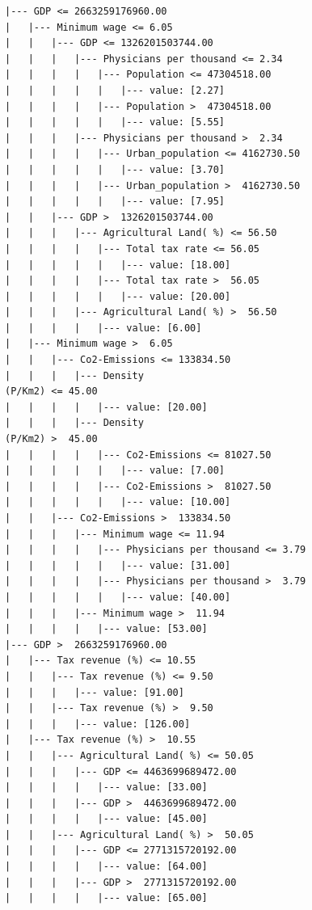 \documentclass{article}
\begin{document}
\clearpage
\begin{lstlisting}[caption=Arbre sur les données de 2024]
|--- GDP <= 2663259176960.00
|   |--- Minimum wage <= 6.05
|   |   |--- GDP <= 1326201503744.00
|   |   |   |--- Physicians per thousand <= 2.34
|   |   |   |   |--- Population <= 47304518.00
|   |   |   |   |   |--- value: [2.27]
|   |   |   |   |--- Population >  47304518.00
|   |   |   |   |   |--- value: [5.55]
|   |   |   |--- Physicians per thousand >  2.34
|   |   |   |   |--- Urban_population <= 4162730.50
|   |   |   |   |   |--- value: [3.70]
|   |   |   |   |--- Urban_population >  4162730.50
|   |   |   |   |   |--- value: [7.95]
|   |   |--- GDP >  1326201503744.00
|   |   |   |--- Agricultural Land( %) <= 56.50
|   |   |   |   |--- Total tax rate <= 56.05
|   |   |   |   |   |--- value: [18.00]
|   |   |   |   |--- Total tax rate >  56.05
|   |   |   |   |   |--- value: [20.00]
|   |   |   |--- Agricultural Land( %) >  56.50
|   |   |   |   |--- value: [6.00]
|   |--- Minimum wage >  6.05
|   |   |--- Co2-Emissions <= 133834.50
|   |   |   |--- Density
(P/Km2) <= 45.00
|   |   |   |   |--- value: [20.00]
|   |   |   |--- Density
(P/Km2) >  45.00
|   |   |   |   |--- Co2-Emissions <= 81027.50
|   |   |   |   |   |--- value: [7.00]
|   |   |   |   |--- Co2-Emissions >  81027.50
|   |   |   |   |   |--- value: [10.00]
|   |   |--- Co2-Emissions >  133834.50
|   |   |   |--- Minimum wage <= 11.94
|   |   |   |   |--- Physicians per thousand <= 3.79
|   |   |   |   |   |--- value: [31.00]
|   |   |   |   |--- Physicians per thousand >  3.79
|   |   |   |   |   |--- value: [40.00]
|   |   |   |--- Minimum wage >  11.94
|   |   |   |   |--- value: [53.00]
|--- GDP >  2663259176960.00
|   |--- Tax revenue (%) <= 10.55
|   |   |--- Tax revenue (%) <= 9.50
|   |   |   |--- value: [91.00]
|   |   |--- Tax revenue (%) >  9.50
|   |   |   |--- value: [126.00]
|   |--- Tax revenue (%) >  10.55
|   |   |--- Agricultural Land( %) <= 50.05
|   |   |   |--- GDP <= 4463699689472.00
|   |   |   |   |--- value: [33.00]
|   |   |   |--- GDP >  4463699689472.00
|   |   |   |   |--- value: [45.00]
|   |   |--- Agricultural Land( %) >  50.05
|   |   |   |--- GDP <= 2771315720192.00
|   |   |   |   |--- value: [64.00]
|   |   |   |--- GDP >  2771315720192.00
|   |   |   |   |--- value: [65.00]
\end{lstlisting}
\end{document}
